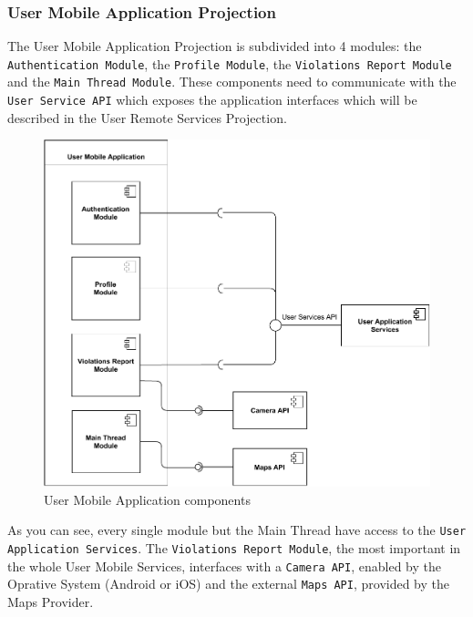 \documentclass[12pt,a4paper]{article}
\begin{document}
\subsubsection{User Mobile Application Projection}
The User Mobile Application Projection is subdivided into 4 modules: the \texttt{Authentication Module}, the \texttt{Profile Module}, the \texttt{Violations Report Module} and the \texttt{Main Thread Module}. These components need to communicate with the \texttt{User Service API} which exposes the application interfaces which will be described in the User Remote Services Projection. 
\begin{figure}[H]
		\centering
		\includegraphics[width=1.2\linewidth]{../assets/images/user_mobile_projection.pdf}
		\caption{User Mobile Application components}
	\end{figure}
As you can see, every single module but the Main Thread have access to the \texttt{User Application Services}. The \texttt{Violations Report Module}, the most important in the whole User Mobile Services, interfaces with a \texttt{Camera API}, enabled by the Oprative System (Android or iOS) and the external \texttt{Maps API}, provided by the Maps Provider.
\end{document}
